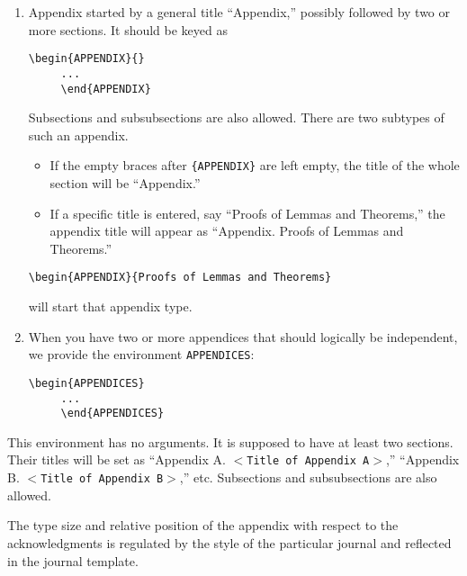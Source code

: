 \documentclass[ijds,nonblindrev]{informs4}
\begin{document}
\begin{enumerate}
\item Appendix started by a general title ``Appendix,'' possibly followed by two 
or more sections. It should be keyed as

\begin{Verbatim}[fontsize=\small]
     \begin{APPENDIX}{}
     ...
     \end{APPENDIX}
\end{Verbatim}

\noindent Subsections and subsubsections are also allowed. There are two subtypes of 
such an appendix.
\begin{itemize}
\item If the empty braces after \texttt{\{APPENDIX\}} are left empty, the title of the 
whole section will be ``Appendix.''

\item If a specific title is entered, say ``Proofs of Lemmas and Theorems,'' the 
appendix title will appear as ``Appendix. Proofs of Lemmas and Theorems.''
\end{itemize}

\begin{Verbatim}[fontsize=\small]
     \begin{APPENDIX}{Proofs of Lemmas and Theorems}
\end{Verbatim}

\noindent 
will start that appendix type.

\item When you have two or more appendices that should logically be independent, 
we provide the environment \texttt{APPENDICES}:
\begin{Verbatim}[fontsize=\small]
     \begin{APPENDICES}
     ...
     \end{APPENDICES}
\end{Verbatim}
\end{enumerate}

\noindent 
This environment has no arguments. It is supposed to have at least two 
sections. Their titles will be set as ``Appendix A. \texttt{$<$Title
of Appendix A$>$},'' ``Appendix B. \texttt{$<$Title of Appendix B$>$},'' etc. Subsections and subsubsections 
are also allowed.

The type size and relative position of the appendix with respect to the 
acknowledgments is regulated by the style of the particular journal and 
reflected in the journal template.
\end{document}
